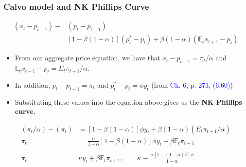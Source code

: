 \documentclass[10pt, xcolor=x11names, table]{beamer}
\begin{document}
\begin{frame}
\frametitle{Calvo model and NK Phillips Curve}
\begin{align*}
(x_{t} - p_{t-1}) - &(p_{t} - p_{t-1}) =  \\
&[1-\beta(1-\alpha)](p^{*}_{t} - p_{t}) + \beta(1-\alpha)(\mathbb{E}_{t}x_{t+1} - p_{t})
\end{align*}
\begin{itemize}
  \item From our aggregate price equation, we have that $\textstyle x_{t} - p_{t-1} = {\pi_{t}}/{\alpha}$ and $\mathbb{E}_{t}x_{t+1} - p_{t} = E_{t}\pi_{t+1}/\alpha$.
  \item In addition, $p_{t} - p_{t-1} = \pi_{t}$ and $p_{t}^{*} - p_{t} = \phi{y_{t}}$ (from \textcolor{blue}{Ch. 6, p. 273, (6.60)})
  \item Substituting these values into the equation above gives us the \textbf{NK Phillips curve},
\end{itemize}
\begin{align*}
({\pi_{t}}/{\alpha}) - (\pi_{t}) &= [1-\beta(1-\alpha)]\phi{y_{t}} + \beta(1-\alpha)(E_{t}\pi_{t+1}/\alpha) \\
\pi_{t} &= \frac{\alpha}{1-\alpha}[1-\beta(1-\alpha)]\phi{y_{t}} + \beta\mathbb{E}_{t}\pi_{t+1} \\~\\
\pi_{t}=&\kappa{y_{t}} + \beta\mathbb{E}_{t}\pi_{t+1}, \qquad \kappa \equiv \frac{\alpha[1-(1-\alpha)\beta]\phi}{1-\alpha}
\end{align*}
\end{frame}
\end{document}
